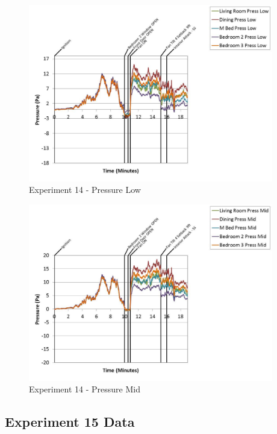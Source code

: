 \documentclass{article}
\begin{document}
\begin{appendices}
	\clearpage

	\begin{figure}[h!]
		\centering
		\includegraphics[height=3.05in]{0_Images/Results_Charts/Exp_14_Charts/PressureLow.pdf}
		\caption{Experiment 14 - Pressure Low}
	\end{figure}
 

	\begin{figure}[h!]
		\centering
		\includegraphics[height=3.05in]{0_Images/Results_Charts/Exp_14_Charts/PressureMid.pdf}
		\caption{Experiment 14 - Pressure Mid}
	\end{figure}
 
	\clearpage

		\clearpage
\clearpage		\large
\subsection{Experiment 15 Data} \label{App:Exp15Results} 


\end{appendices}
\end{document}
